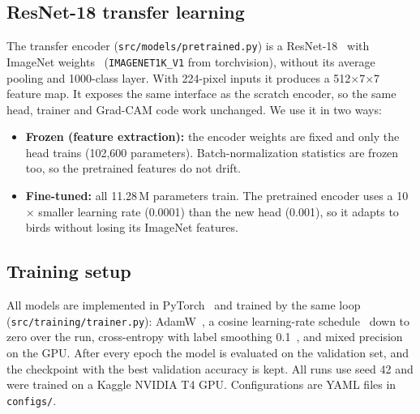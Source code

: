 \documentclass[11pt,a4paper]{article}
\begin{document}
\subsection{ResNet-18 transfer learning}

The transfer encoder (\texttt{src/models/pretrained.py}) is a
ResNet-18~\cite{he2016} with ImageNet weights~\cite{deng2009}
(\texttt{IMAGENET1K\_V1} from torchvision), without its average pooling and
1000-class layer. With 224-pixel inputs it produces a 512$\times$7$\times$7
feature map. It exposes the same interface as the scratch encoder, so the same
head, trainer and Grad-CAM code work unchanged. We use it in two ways:
\begin{itemize}
  \item \textbf{Frozen (feature extraction):} the encoder weights are fixed
        and only the head trains (102,600 parameters). Batch-normalization
        statistics are frozen too, so the pretrained features do not drift.
  \item \textbf{Fine-tuned:} all 11.28\,M parameters train. The pretrained
        encoder uses a 10$\times$ smaller learning rate (0.0001) than the new
        head (0.001), so it adapts to birds without losing its ImageNet
        features.
\end{itemize}

\subsection{Training setup}

All models are implemented in PyTorch~\cite{pytorch} and trained by the same
loop (\texttt{src/training/trainer.py}):
AdamW~\cite{loshchilov2019}, a cosine learning-rate schedule~\cite{loshchilov2017}
down to zero over the run, cross-entropy with label smoothing
0.1~\cite{szegedy2016}, and mixed precision on the GPU. After every epoch the
model is evaluated on the validation set, and the checkpoint with the best
validation accuracy is kept. All runs use seed 42 and were trained on a Kaggle
NVIDIA T4 GPU. Configurations are YAML files in \texttt{configs/}.

\begin{table}[H]
\centering
\caption{Training configurations of the final models.}
\label{tab:configs}
\end{table}
\end{document}

